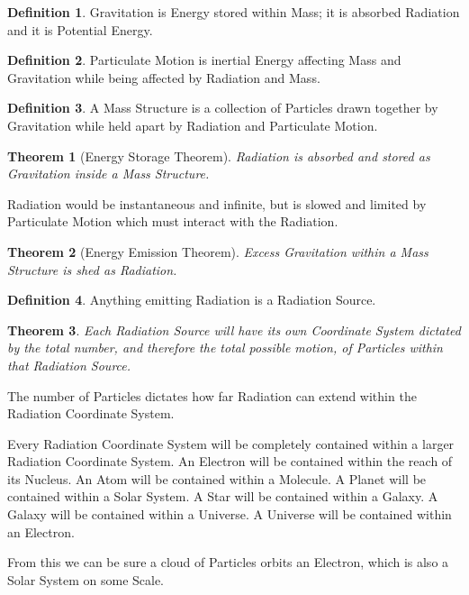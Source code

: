 \documentclass[12pt]{article}
\theoremstyle{plain}
\newtheorem{theorem}{Theorem}
\theoremstyle{definition}
\newtheorem{definition}{Definition}
\begin{document}
\begin{definition}
Gravitation is Energy stored within Mass; it is absorbed Radiation and it is Potential Energy.
\end{definition}

\begin{definition}
Particulate Motion is inertial Energy affecting Mass and Gravitation while being affected by Radiation and Mass.
\end{definition}

\begin{definition}
A Mass Structure is a collection of Particles drawn together by Gravitation while held apart by Radiation and Particulate Motion.
\end{definition}

\begin{theorem}[Energy Storage Theorem]
Radiation is absorbed and stored as Gravitation inside a Mass Structure.
\end{theorem}

Radiation would be instantaneous and infinite, but is slowed and limited by Particulate Motion which must interact with the Radiation.

\begin{theorem}[Energy Emission Theorem]
Excess Gravitation within a Mass Structure is shed as Radiation.
\end{theorem}

\begin{definition}
Anything emitting Radiation is a Radiation Source.
\end{definition}

\begin{theorem}
Each Radiation Source will have its own Coordinate System dictated by the total number, and therefore the total possible motion, of Particles within that Radiation Source.
\end{theorem}

The number of Particles dictates how far Radiation can extend within the Radiation Coordinate System.

Every Radiation Coordinate System will be completely contained within a larger Radiation Coordinate System. An Electron will be contained within the reach of its Nucleus. An Atom will be contained within a Molecule. A Planet will be contained within a Solar System. A Star will be contained within a Galaxy. A Galaxy will be contained within a Universe. A Universe will be contained within an Electron.

From this we can be sure a cloud of Particles orbits an Electron, which is also a Solar System on some Scale.
\end{document}
